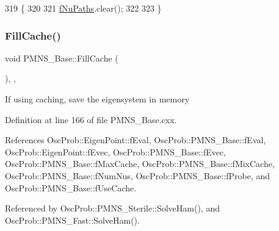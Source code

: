 \begin{DoxyCode}
319                          \{
320 
321   \hyperlink{classOscProb_1_1PMNS__Base_a69db9d57e12fc7cbe0431bc6c18fac93}{fNuPaths}.clear();
322 
323 \}
\end{DoxyCode}
\mbox{\label{classOscProb_1_1PMNS__Base_a785c37fcea974628623c8881bb0fbbf9}} 
\subsubsection{\texorpdfstring{Fill\+Cache()}{FillCache()}}
{\footnotesize\ttfamily void P\+M\+N\+S\+\_\+\+Base\+::\+Fill\+Cache (\begin{DoxyParamCaption}{ }\end{DoxyParamCaption})\hspace{0.3cm}{\ttfamily [protected]}, {\ttfamily [virtual]}, {\ttfamily [inherited]}}

If using caching, save the eigensystem in memory 

Definition at line 166 of file P\+M\+N\+S\+\_\+\+Base.\+cxx.



References Osc\+Prob\+::\+Eigen\+Point\+::f\+Eval, Osc\+Prob\+::\+P\+M\+N\+S\+\_\+\+Base\+::f\+Eval, Osc\+Prob\+::\+Eigen\+Point\+::f\+Evec, Osc\+Prob\+::\+P\+M\+N\+S\+\_\+\+Base\+::f\+Evec, Osc\+Prob\+::\+P\+M\+N\+S\+\_\+\+Base\+::f\+Max\+Cache, Osc\+Prob\+::\+P\+M\+N\+S\+\_\+\+Base\+::f\+Mix\+Cache, Osc\+Prob\+::\+P\+M\+N\+S\+\_\+\+Base\+::f\+Num\+Nus, Osc\+Prob\+::\+P\+M\+N\+S\+\_\+\+Base\+::f\+Probe, and Osc\+Prob\+::\+P\+M\+N\+S\+\_\+\+Base\+::f\+Use\+Cache.



Referenced by Osc\+Prob\+::\+P\+M\+N\+S\+\_\+\+Sterile\+::\+Solve\+Ham(), and Osc\+Prob\+::\+P\+M\+N\+S\+\_\+\+Fast\+::\+Solve\+Ham().


